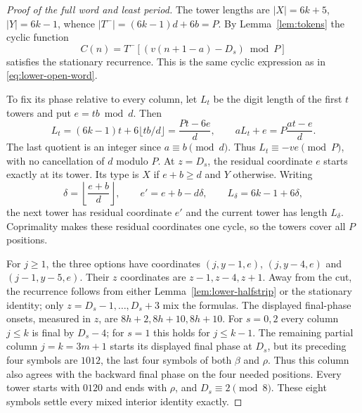 \documentclass[11pt]{article}
\theoremstyle{remark}\newtheorem{remark}[theorem]{Remark}
\begin{document}
\begin{proof}[Proof of the full word and least period]
The tower lengths are $|X|=6k+5$, $|Y|=6k-1$, whence
$|T^-|=(6k-1)d+6b=P$. By Lemma~\ref{lem:tokens} the cyclic function
\[
 C(n)=T^-[(v(n+1-a)-D_s)\bmod P]
\]
satisfies the stationary recurrence. This is the same cyclic expression
as in \eqref{eq:lower-open-word}.

To fix its phase relative to every column, let $L_t$ be the digit length
of the first $t$ towers and put $e=tb\bmod d$. Then
\[
 L_t=(6k-1)t+6\lfloor tb/d\rfloor=\frac{Pt-6e}{d},\qquad
 aL_t+e=P\frac{at-e}{d}.
\]
The last quotient is an integer since $a\equiv b\pmod d$.
Thus $L_t\equiv-ve\pmod P$, with no cancellation of $d$ modulo $P$.
At $z=D_s$, the residual coordinate $e$ starts exactly at its tower.
Its type is $X$ if $e+b\ge d$ and $Y$ otherwise. Writing
\[
 \delta=\left\lfloor\frac{e+b}{d}\right\rfloor,\qquad
 e'=e+b-d\delta,\qquad L_\delta=6k-1+6\delta,
\]
the next tower has residual coordinate $e'$ and the current tower has
length $L_\delta$. Coprimality makes these residual coordinates one
cycle, so the towers cover all $P$ positions.

For $j\ge1$, the three options have coordinates
$(j,y-1,e)$, $(j,y-4,e)$ and $(j-1,y-5,e)$.
Their $z$ coordinates are $z-1,z-4,z+1$. Away from the cut, the
recurrence follows from either Lemma~\ref{lem:lower-halfstrip} or the
stationary identity; only $z=D_s-1,\ldots,D_s+3$ mix the formulas.
The displayed final-phase onsets, measured in $z$, are $8h+2,8h+10,8h+10$.
For $s=0,2$ every column $j\le k$ is final by $D_s-4$; for $s=1$ this
holds for $j\le k-1$. The remaining partial column $j=k=3m+1$ starts
its displayed final phase at $D_s$, but its preceding four symbols are
$1012$, the last four symbols of both $\beta$ and $\rho$.
Thus this column also agrees with the backward final phase on the four
needed positions. Every tower starts with $0120$ and ends with $\rho$,
and $D_s\equiv2\pmod8$. These eight symbols settle every mixed interior
identity exactly.


\end{proof}
\end{document}
